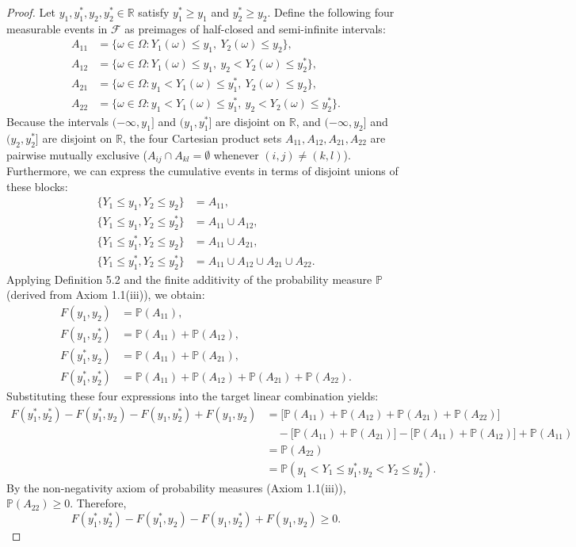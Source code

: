 \documentclass[11pt, letterpaper]{article}
\theoremstyle{definition}
\theoremstyle{remark}
\begin{document}
\begin{proof}
Let $y_1, y_1^*, y_2, y_2^* \in \mathbb{R}$ satisfy $y_1^* \ge y_1$ and $y_2^* \ge y_2$. Define the following four measurable events in $\mathcal{F}$ as preimages of half-closed and semi-infinite intervals:
\begin{align*}
    A_{11} &= \{\omega \in \Omega : Y_1(\omega) \le y_1,\ Y_2(\omega) \le y_2\}, \\
    A_{12} &= \{\omega \in \Omega : Y_1(\omega) \le y_1,\ y_2 < Y_2(\omega) \le y_2^*\}, \\
    A_{21} &= \{\omega \in \Omega : y_1 < Y_1(\omega) \le y_1^*,\ Y_2(\omega) \le y_2\}, \\
    A_{22} &= \{\omega \in \Omega : y_1 < Y_1(\omega) \le y_1^*,\ y_2 < Y_2(\omega) \le y_2^*\}.
\end{align*}
Because the intervals $(-\infty, y_1]$ and $(y_1, y_1^*]$ are disjoint on $\mathbb{R}$, and $(-\infty, y_2]$ and $(y_2, y_2^*]$ are disjoint on $\mathbb{R}$, the four Cartesian product sets $A_{11}, A_{12}, A_{21}, A_{22}$ are pairwise mutually exclusive ($A_{ij} \cap A_{kl} = \emptyset$ whenever $(i,j) \neq (k,l)$). Furthermore, we can express the cumulative events in terms of disjoint unions of these blocks:
\begin{align*}
    \{Y_1 \le y_1, Y_2 \le y_2\} &= A_{11}, \\
    \{Y_1 \le y_1, Y_2 \le y_2^*\} &= A_{11} \cup A_{12}, \\
    \{Y_1 \le y_1^*, Y_2 \le y_2\} &= A_{11} \cup A_{21}, \\
    \{Y_1 \le y_1^*, Y_2 \le y_2^*\} &= A_{11} \cup A_{12} \cup A_{21} \cup A_{22}.
\end{align*}
Applying Definition 5.2 and the finite additivity of the probability measure $\mathbb{P}$ (derived from Axiom 1.1(iii)), we obtain:
\begin{align*}
    F(y_1, y_2) &= \mathbb{P}(A_{11}), \\
    F(y_1, y_2^*) &= \mathbb{P}(A_{11}) + \mathbb{P}(A_{12}), \\
    F(y_1^*, y_2) &= \mathbb{P}(A_{11}) + \mathbb{P}(A_{21}), \\
    F(y_1^*, y_2^*) &= \mathbb{P}(A_{11}) + \mathbb{P}(A_{12}) + \mathbb{P}(A_{21}) + \mathbb{P}(A_{22}).
\end{align*}
Substituting these four expressions into the target linear combination yields:
\begin{align*}
    F(y_1^*, y_2^*) - F(y_1^*, y_2) - F(y_1, y_2^*) + F(y_1, y_2) 
    &= \bigl[\mathbb{P}(A_{11}) + \mathbb{P}(A_{12}) + \mathbb{P}(A_{21}) + \mathbb{P}(A_{22})\bigr] \\
    &\quad - \bigl[\mathbb{P}(A_{11}) + \mathbb{P}(A_{21})\bigr] - \bigl[\mathbb{P}(A_{11}) + \mathbb{P}(A_{12})\bigr] + \mathbb{P}(A_{11}) \\
    &= \mathbb{P}(A_{22}) \\
    &= \mathbb{P}(y_1 < Y_1 \le y_1^*, y_2 < Y_2 \le y_2^*).
\end{align*}
By the non-negativity axiom of probability measures (Axiom 1.1(iii)), $\mathbb{P}(A_{22}) \ge 0$. Therefore,
\[
    F(y_1^*, y_2^*) - F(y_1^*, y_2) - F(y_1, y_2^*) + F(y_1, y_2) \ge 0.
\]
\end{proof}
\end{document}
